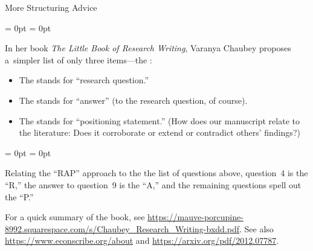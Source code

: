 \documentclass[aspectratio = 169, t, 10pt]{beamer}
\begin{document}
\begin{frame}[allowframebreaks]{More Structuring Advice}

\begin{list}{}{\leftmargin = 0pt \itemindent = 0pt}
	\item In her book \textit{The Little Book of Research Writing}, Varanya Chaubey proposes a~simpler list of only three items---the :
\end{list}

\begin{itemize}
	\item The  stands for ``research question.''
	\item The  stands for ``answer'' (to the research question, of course).
	\item The  stands for ``positioning statement.'' (How does our manuscript relate to the literature: Does it corroborate or extend or contradict others' findings?)
\end{itemize}

\begin{list}{}{\leftmargin = 0pt \itemindent = 0pt}
	\item Relating the ``RAP'' approach to the the list of questions above, question~4 is the ``R,'' the answer to question~9 is the ``A,'' and the remaining questions spell out the ``P.''
	\item For a quick summary of the book, see \url{https://mauve-porcupine-8992.squarespace.com/s/Chaubey_Research_Writing-bxdd.pdf}. See also \url{https://www.econscribe.org/about} and \url{https://arxiv.org/pdf/2012.07787}.
\end{list}

\end{frame}


\end{document}
